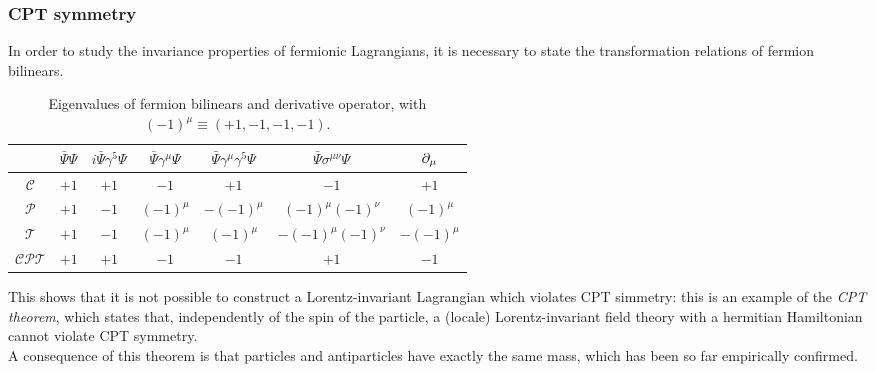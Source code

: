 \subsubsection{CPT symmetry}

 In order to study the invariance properties of fermionic Lagrangians, it is necessary to state the transformation relations of fermion bilinears.

 \begin{table}[h!]
  \centering
  \begin{tabular}{ccccccc}
    \hline
    \rule{0pt}{2.5ex} & $ \bar{\Psi} \Psi $ & $ i \bar{\Psi} \gamma^5 \Psi $ & $ \bar{\Psi} \gamma^\mu \Psi $ & $ \bar{\Psi} \gamma^\mu \gamma^5 \Psi $ & $ \bar{\Psi} \sigma^{\mu \nu} \Psi $ & $ \partial_\mu $ \\
    \hline
    \rule{0pt}{2.5ex} $ \mathcal{C} $ & $ +1 $ & $ +1 $ & $ -1 $ & $ +1 $ & $ -1 $ & $ +1 $ \\
    \rule{0pt}{2.5ex} $ \mathcal{P} $ & $ +1 $ & $ -1 $ & $ (-1)^\mu $ & $ - (-1)^\mu $ & $ (-1)^\mu (-1)^\nu $ & $ (-1)^\mu $ \\
    \rule{0pt}{2.5ex} $ \mathcal{T} $ & $ +1 $ & $ -1 $ & $ (-1)^\mu $ & $ (-1)^\mu $ & $ - (-1)^\mu (-1)^\nu $ & $ - (-1)^\mu $ \\
    \rule{0pt}{2.5ex} $ \mathcal{CPT} $ & $ +1 $ & $ +1 $ & $ -1 $ & $ -1 $ & $ +1 $ & $ -1 $
  \end{tabular}
  \caption{Eigenvalues of fermion bilinears and derivative operator, with $ (-1)^\mu \equiv (+1,-1,-1,-1) $.}
  \label{tab:ferm-bil-eigen}
 \end{table}

 This shows that it is not possible to construct a Lorentz-invariant Lagrangian which violates CPT simmetry: this is an example of the \textit{CPT theorem}, which states that, independently of the spin of the particle, a (locale) Lorentz-invariant field theory with a hermitian Hamiltonian cannot violate CPT symmetry.\\
 A consequence of this theorem is that particles and antiparticles have exactly the same mass, which has been so far empirically confirmed.










